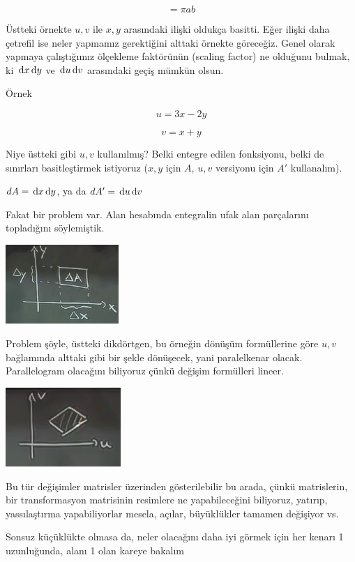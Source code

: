 \documentclass[12pt,fleqn]{article}\usepackage{../../common}
\begin{document}
$$ = \pi ab $$

Üstteki örnekte $u,v$ ile $x,y$ arasındaki ilişki oldukça basitti. Eğer ilişki
daha çetrefil ise neler yapmamız gerektiğini alttaki örnekte göreceğiz. Genel
olarak yapmaya çalıştığımız ölçekleme faktörünün (scaling factor) ne olduğunu
bulmak, ki $\,\mathrm{d} x \,\mathrm{d} y$ ve $\,\mathrm{d} u \,\mathrm{d} v$ arasındaki geçiş mümkün olsun.

Örnek 

$$ u = 3x - 2y $$

$$ v = x + y $$

Niye üstteki gibi $u,v$ kullanılmış? Belki entegre edilen fonksiyonu, belki
de sınırları basitleştirmek istiyoruz ($x,y$ için $A$, $u,v$ versiyonu için
$A'$ kullanalım). 

$dA = \,\mathrm{d} x \,\mathrm{d} y$, ya da $dA' = \,\mathrm{d} u \,\mathrm{d} v$ 

Fakat bir problem var. Alan hesabında entegralin ufak alan parçalarını
topladığını söylemiştik. 

\begin{center}
\includegraphics[height=3cm]{18_2.png}
\end{center}

Problem şöyle, üstteki dikdörtgen, bu örneğin dönüşüm formüllerine göre
$u,v$ bağlamında alttaki gibi bir şekle dönüşecek, yani paralelkenar
olacak. Parallelogram olacağını biliyoruz çünkü değişim formülleri
lineer.

\begin{center}
\includegraphics[height=3cm]{18_3.png}
\end{center}

Bu tür değişimler matrisler üzerinden gösterilebilir bu arada, çünkü
matrislerin, bir transformasyon matrisinin resimlere ne yapabileceğini
biliyoruz, yatırıp, yassılaştırma yapabiliyorlar mesela, açılar,
büyüklükler tamamen değişiyor vs. 

Sonsuz küçüklükte olmasa da, neler olacağını daha iyi görmek için her
kenarı 1 uzunluğunda, alanı 1 olan kareye bakalım
\end{document}
